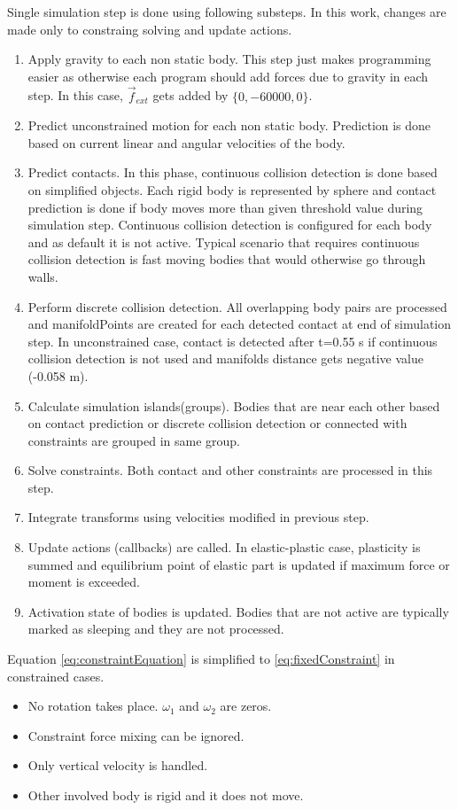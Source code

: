 Single simulation step is done using following substeps. 
In this work, changes are made only to constraing solving and update actions.
\begin{enumerate}
\item Apply gravity to each non static body. 
This step just makes programming easier as otherwise each program should add forces due to gravity in each step. 
In this case, $\vec{f}_{ext}$ gets added by $\lbrace{0,-60000,0}\rbrace$.
\item Predict unconstrained motion for each non static body. Prediction is done based on current linear and angular velocities of the body.
\item Predict contacts. In this phase, continuous collision detection is done based on simplified objects. 
Each rigid body is represented by sphere and contact prediction is done if body moves more than given threshold value during simulation step. Continuous collision detection is configured for each body and as default it is not active. 
Typical scenario that requires continuous collision detection is fast moving bodies that would otherwise go through walls.
\item Perform discrete collision detection. All overlapping body pairs are processed and manifoldPoints are created for
each detected contact at end of simulation step. 
In unconstrained case, contact is detected after t=0.55 s if continuous collision detection is not used and manifolds distance gets negative value (-0.058 m).
\item Calculate simulation islands(groups). Bodies that are near each other based on contact prediction or discrete collision detection
 or connected with constraints are grouped in same group.
\item Solve constraints. Both contact and other constraints are processed in this step.
\item Integrate transforms using velocities modified in previous step.
\item Update actions (callbacks) are called. 
In elastic-plastic case, plasticity is summed and equilibrium point of elastic part is updated if maximum force or moment is exceeded.
\item Activation state of bodies is updated. Bodies that are not active
 are typically marked as sleeping and they are not processed.
\end{enumerate} 

Equation \ref{eq:constraintEquation} is simplified
to \ref{eq:fixedConstraint} in constrained cases.
\begin{itemize}
\item No rotation takes place. $\omega_1$ and $\omega_2$ are zeros.
\item Constraint force mixing can be ignored.
\item Only vertical velocity is handled.
\item Other involved body is rigid and it does not move.
\end{itemize} 

